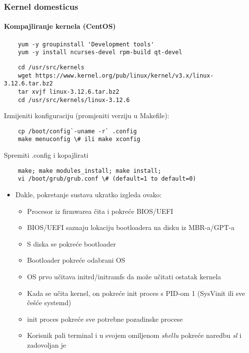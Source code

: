 \documentclass[t]{beamer}
\begin{document}
\begin{frame}[fragile]
	\frametitle{Kernel domesticus}
	\framesubtitle{Kompajliranje kernela (CentOS)}
    \footnotesize
    \begin{verbatim}
	yum -y groupinstall 'Development tools'
	yum -y install ncurses-devel rpm-build qt-devel
	\end{verbatim}
	\begin{verbatim}
	cd /usr/src/kernels
	wget https://www.kernel.org/pub/linux/kernel/v3.x/linux-3.12.6.tar.bz2
	tar xvjf linux-3.12.6.tar.bz2
	cd /usr/src/kernels/linux-3.12.6
	\end{verbatim}
	Izmijeniti konfiguraciju (promjeniti verziju u Makefile):
	\begin{verbatim}
	cp /boot/config`-uname -r` .config
	make menuconfig \# ili make xconfig
	\end{verbatim}
	Spremiti .config i kopajlirati
	\begin{verbatim}
	make; make modules_install; make install;
	vi /boot/grub/grub.conf \# (default=1 to default=0)
	\end{verbatim}
\end{frame}

\begin{frame}
	\begin{itemize}
		\item Dakle, pokretanje sustava ukratko izgleda ovako:
		\begin{itemize}
			\item Procesor iz firmwarea čita i pokreće BIOS/UEFI
			\item BIOS/UEFI saznaju lokaciju bootloadera na disku iz MBR-a/GPT-a
			\item S diska se pokreće bootloader
			\item Bootloader pokreće odabrani OS
			\item OS prvo učitava initrd/initramfs da može učitati ostatak kernela
			\item Kada se učita kernel, on pokreće init proces s PID-om 1 (SysVinit ili sve češće systemd)
			\item init proces pokreće sve potrebne pozadinske procese
			\item Korisnik pali terminal i u svojem omiljenom \textit{shellu} pokreće naredbu \textit{sl} i zadovoljan je
		\end{itemize}
	\end{itemize}
\end{frame}
\end{document}
